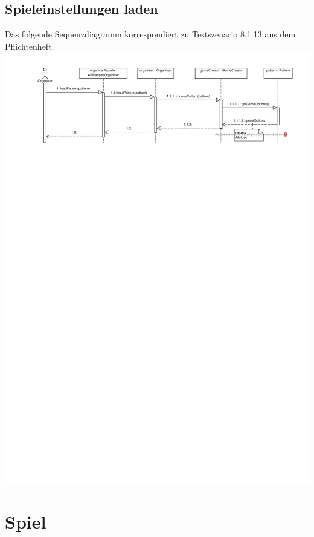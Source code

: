 \documentclass[a4paper]{scrreprt}
\begin{document}
	\subsection{Spieleinstellungen laden}
	Das folgende Sequenzdiagramm korrespondiert zu Testszenario 8.1.13 aus dem Pflichtenheft. \\
	\includegraphics[width=\textwidth]{img/Spieleinstellungen_laden.pdf}


	\section{Spiel}
\end{document}
